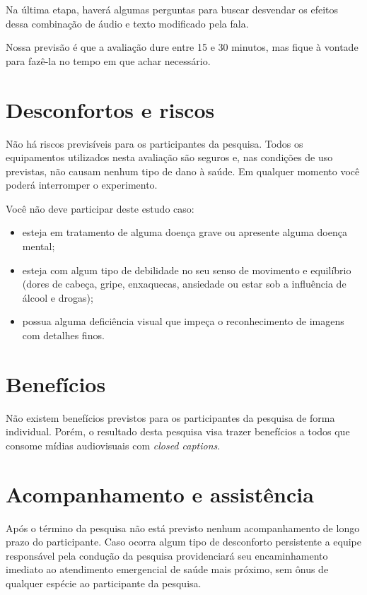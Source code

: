 \documentclass[a4paper,11pt,titlepage,singlespacing]{article}
\begin{document}
Na última etapa, haverá algumas perguntas para buscar desvendar os efeitos dessa combinação de áudio e texto modificado pela fala.

Nossa previsão é que a avaliação dure entre 15 e 30 minutos, mas fique à vontade para fazê-la no tempo em que achar necessário.



\section*{Desconfortos e riscos}

\noindent Não há riscos previsíveis para os participantes da pesquisa. Todos os equipamentos utilizados nesta avaliação são seguros e, nas condições de uso previstas, não causam nenhum tipo de dano à saúde. Em qualquer momento você poderá interromper o experimento.

Você não deve participar deste estudo caso:

\begin{itemize}
\item esteja em tratamento de alguma doença grave ou apresente alguma doença mental;
\item esteja com algum tipo de debilidade no seu senso de movimento e equilíbrio (dores de cabeça, gripe, enxaquecas, ansiedade ou estar sob a influência de álcool e drogas);
\item possua alguma deficiência visual que impeça o reconhecimento de imagens com detalhes finos.
\end{itemize}

\section*{Benefícios}

\noindent Não existem benefícios previstos para os participantes da pesquisa de forma individual. Porém, o resultado desta pesquisa visa trazer benefícios a todos que consome mídias audiovisuais com \textit{closed captions}.

\section*{Acompanhamento e assistência}

\noindent Após o término da pesquisa não está previsto nenhum acompanhamento de longo prazo do participante. Caso ocorra algum tipo de desconforto persistente a equipe responsável pela condução da pesquisa providenciará seu encaminhamento imediato ao atendimento emergencial de saúde mais próximo, sem ônus de qualquer espécie ao participante da pesquisa.
\end{document}
